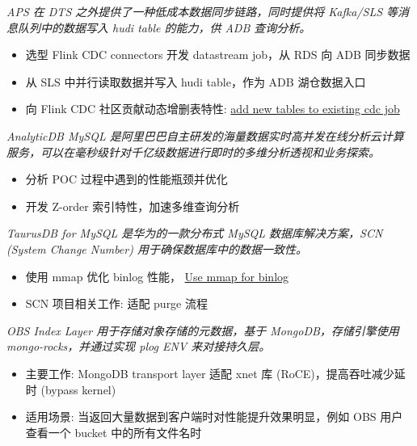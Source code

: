 \documentclass{resume}
\begin{document}
\textit{APS 在 DTS 之外提供了一种低成本数据同步链路，同时提供将 Kafka/SLS 等消息队列中的数据写入 hudi table 的能力，供 ADB 查询分析。}
\begin{onehalfspacing}
\begin{itemize}
  \item 选型 Flink CDC connectors 开发 datastream job，从 RDS 向 ADB 同步数据
  \item 从 SLS 中并行读取数据并写入 hudi table，作为 ADB 湖仓数据入口
  \item 向 Flink CDC 社区贡献动态增删表特性: \href{https://github.com/ververica/flink-cdc-connectors/pull/777}{add new tables to existing cdc job}
\end{itemize}
\end{onehalfspacing}

\textit{AnalyticDB MySQL 是阿里巴巴自主研发的海量数据实时高并发在线分析云计算服务，可以在毫秒级针对千亿级数据进行即时的多维分析透视和业务探索。}
\begin{onehalfspacing}
\begin{itemize}
  \item 分析 POC 过程中遇到的性能瓶颈并优化
  \item 开发 Z-order 索引特性，加速多维查询分析
\end{itemize}
\end{onehalfspacing}

\textit{TaurusDB for MySQL 是华为的一款分布式 MySQL 数据库解决方案，SCN (System Change Number) 用于确保数据库中的数据一致性。}
\begin{onehalfspacing}
\begin{itemize}
  \item 使用 mmap 优化 binlog 性能， \href{https://github.com/mysql/mysql-server/pull/314}{Use mmap for binlog}
  \item SCN 项目相关工作: 适配 purge 流程
\end{itemize}
\end{onehalfspacing}

\textit{OBS Index Layer 用于存储对象存储的元数据，基于 MongoDB，存储引擎使用 mongo-rocks，并通过实现 plog ENV 来对接持久层。}
\begin{onehalfspacing}
\begin{itemize}
  \item 主要工作: MongoDB transport layer 适配 xnet 库 (RoCE)，提高吞吐减少延时 (bypass kernel)
  \item 适用场景: 当返回大量数据到客户端时对性能提升效果明显，例如 OBS 用户查看一个 bucket 中的所有文件名时
\end{itemize}
\end{onehalfspacing}
\end{document}
